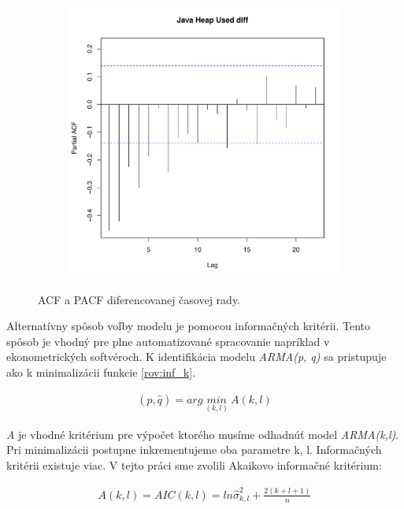 \documentclass[12pt,a4paper,oneside,final]{article}
\theoremstyle{definition}
\theoremstyle{remark}
\numberwithin{equation}{section}
\begin{document}
\begin{figure}[H]
\begin{subfigure}[b]{0.45\textwidth}
        \includegraphics[width=1\linewidth]{images/heap_diff_pacf.pdf}
    \end{subfigure}
    \caption{ACF a PACF diferencovanej časovej rady.}
    \label{obr:heap_diff_acf_pacf}
\end{figure}

Alternatívny spôsob voľby modelu je pomocou informačných kritérii. Tento spôsob je
vhodný pre plne automatizované spracovanie \cite{cipra} napríklad v ekonometrických 
softvéroch. K identifikácia modelu \emph{ARMA(p, q)} sa pristupuje ako k minimalizácii funkcie
\ref{rov:inf_k}.

\begin{eqnarray} \label{rov:inf_k}
    (\hat{p}, \hat{q}) =arg\ \underset{(k,l)}{min}\ A(k, l)
\end{eqnarray}

\emph{A} je vhodné kritérium pre výpočet ktorého musíme odhadnúť model
\emph{ARMA(k,l)}. Pri minimalizácii postupne inkrementujeme oba parametre k, l.
Informačných kritérii existuje viac. V tejto práci sme zvolili Akaikovo informačné kritérium:

\begin{eqnarray} \label{rov:aic}
    A(k,l) = AIC(k,l) = ln\hat{\sigma}^{2}_{k,l} + \frac{2(k+l+1)}{n}
\end{eqnarray}
\end{document}
